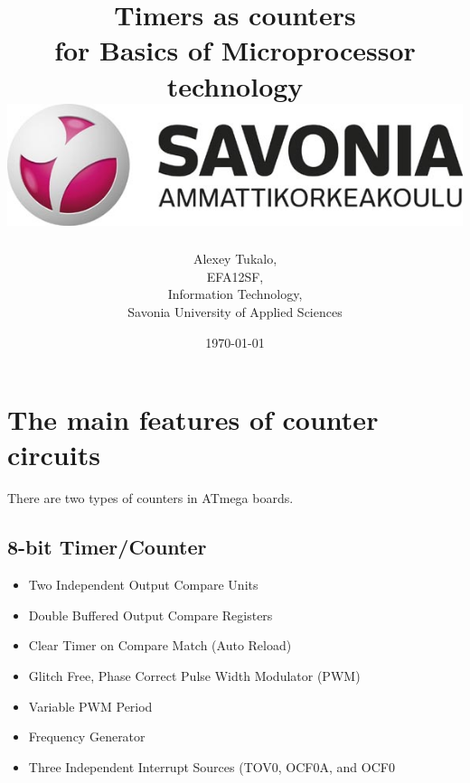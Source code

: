 \documentclass[english]{article}
\date{}
\begin{document}
\title{\vspace{2in}Timers as counters\\
\small for Basics of Microprocessor technology\\
\vspace{0.5in}\includegraphics{savonia.jpg}}

\nopagebreak
\maketitle


\vspace{3in}

\author{
\begin{flushright}
Alexey Tukalo,\\
EFA12SF,\\
Information Technology,\\
Savonia University of Applied Sciences
\end{flushright}
}

\date{\today}
\thispagestyle{empty}

\newpage
\setcounter{page}{1}
\setcounter{tocdepth}{2}
\tableofcontents

\newpage


\section{The main features of counter circuits}
There are two types of counters in ATmega boards.
\subsection{8-bit Timer/Counter}
\begin{itemize}
\item Two Independent Output Compare Units
\item Double Buffered Output Compare Registers
\item Clear Timer on Compare Match (Auto Reload)
\item Glitch Free, Phase Correct Pulse Width Modulator (PWM)
\item Variable PWM Period
\item Frequency Generator
\item Three Independent Interrupt Sources (TOV0, OCF0A, and OCF0
\end{itemize}
\end{document}
